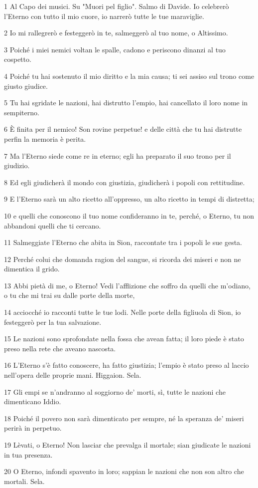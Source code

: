 \par 1 Al Capo dei musici. Su "Muori pel figlio". Salmo di Davide. Io celebrerò l'Eterno con tutto il mio cuore, io narrerò tutte le tue maraviglie.
\par 2 Io mi rallegrerò e festeggerò in te, salmeggerò al tuo nome, o Altissimo.
\par 3 Poiché i miei nemici voltan le spalle, cadono e periscono dinanzi al tuo cospetto.
\par 4 Poiché tu hai sostenuto il mio diritto e la mia causa; ti sei assiso sul trono come giusto giudice.
\par 5 Tu hai sgridate le nazioni, hai distrutto l'empio, hai cancellato il loro nome in sempiterno.
\par 6 È finita per il nemico! Son rovine perpetue! e delle città che tu hai distrutte perfin la memoria è perita.
\par 7 Ma l'Eterno siede come re in eterno; egli ha preparato il suo trono per il giudizio.
\par 8 Ed egli giudicherà il mondo con giustizia, giudicherà i popoli con rettitudine.
\par 9 E l'Eterno sarà un alto ricetto all'oppresso, un alto ricetto in tempi di distretta;
\par 10 e quelli che conoscono il tuo nome confideranno in te, perché, o Eterno, tu non abbandoni quelli che ti cercano.
\par 11 Salmeggiate l'Eterno che abita in Sion, raccontate tra i popoli le sue gesta.
\par 12 Perché colui che domanda ragion del sangue, si ricorda dei miseri e non ne dimentica il grido.
\par 13 Abbi pietà di me, o Eterno! Vedi l'afflizione che soffro da quelli che m'odiano, o tu che mi trai su dalle porte della morte,
\par 14 acciocché io racconti tutte le tue lodi. Nelle porte della figliuola di Sion, io festeggerò per la tua salvazione.
\par 15 Le nazioni sono sprofondate nella fossa che avean fatta; il loro piede è stato preso nella rete che aveano nascosta.
\par 16 L'Eterno s'è fatto conoscere, ha fatto giustizia; l'empio è stato preso al laccio nell'opera delle proprie mani. Higgaion. Sela.
\par 17 Gli empi se n'andranno al soggiorno de' morti, sì, tutte le nazioni che dimenticano Iddio.
\par 18 Poiché il povero non sarà dimenticato per sempre, né la speranza de' miseri perirà in perpetuo.
\par 19 Lèvati, o Eterno! Non lasciar che prevalga il mortale; sian giudicate le nazioni in tua presenza.
\par 20 O Eterno, infondi spavento in loro; sappian le nazioni che non son altro che mortali. Sela.

